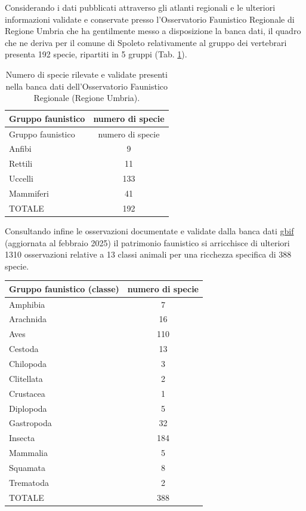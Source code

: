 \documentclass[
  a4paper,
]{book}
\begin{document}
Considerando i dati pubblicati attraverso gli atlanti regionali e le ulteriori informazioni validate e conservate presso l'Osservatorio Faunistico Regionale di Regione Umbria che ha gentilmente messo a disposizione la banca dati, il quadro che ne deriva per il comune di Spoleto relativamente al gruppo dei vertebrari presenta 192 specie, ripartiti in 5 gruppi (Tab. \ref{tab:ofr}).

\begin{longtable}[]{@{}lc@{}}
\caption{\label{tab:ofr} Numero di specie rilevate e validate presenti nella banca dati dell'Osservatorio Faunistico Regionale (Regione Umbria).}\tabularnewline
\toprule\noalign{}
Gruppo faunistico & numero di specie \\
\midrule\noalign{}
\endfirsthead
\toprule\noalign{}
Gruppo faunistico & numero di specie \\
\midrule\noalign{}
\endhead
\bottomrule\noalign{}
\endlastfoot
Anfibi & 9 \\
Rettili & 11 \\
Uccelli & 133 \\
Mammiferi & 41 \\
TOTALE & 192 \\
\end{longtable}

Consultando infine le osservazioni documentate e validate dalla banca dati \href{https://www.gbif.org}{gbif} (aggiornata al febbraio 2025) il patrimonio faunistico si arricchisce di ulteriori 1310 osservazioni relative a 13 classi animali per una ricchezza specifica di 388 specie.

\begin{longtable}[]{@{}lc@{}}
\toprule\noalign{}
Gruppo faunistico (classe) & numero di specie \\
\midrule\noalign{}
\endhead
\bottomrule\noalign{}
\endlastfoot
Amphibia & 7 \\
Arachnida & 16 \\
Aves & 110 \\
Cestoda & 13 \\
Chilopoda & 3 \\
Clitellata & 2 \\
Crustacea & 1 \\
Diplopoda & 5 \\
Gastropoda & 32 \\
Insecta & 184 \\
Mammalia & 5 \\
Squamata & 8 \\
Trematoda & 2 \\
TOTALE & 388 \\
\end{longtable}
\end{document}

